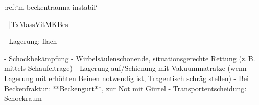 :ref:`m-beckentrauma-instabil`
\begin{itemize}
  -   |TxMassVitMKBes|
  \begin{itemize}
    -   Lagerung: flach
  \end{itemize}
  -   Schockbekämpfung
  -   Wirbelsäulenschonende, situationsgerechte Rettung (z. B. mittels
  Schaufeltrage)
  -   Lagerung auf/Schienung mit Vakuummatratze (wenn
  Lagerung mit erhöhten Beinen notwendig ist,
  Tragentisch schräg stellen)
  -   Bei Beckenfraktur:
  **Beckengurt**, zur Not mit
  Gürtel
  -   Transportentscheidung: Schockraum
\end{itemize}